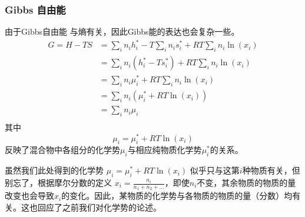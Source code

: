 \subsubsection{Gibbs 自由能}
由于Gibbs自由能 与熵有关，因此Gibbs能的表达也会复杂一些。
$$
\begin{aligned}
G = H-TS &= \sum_i n_i h_i^* - T \sum_i n_i s_i^* + RT \sum_i n_i \ln (x_i)\\ 
&= \sum_i n_i (h_i^* - T s_i^*) + RT \sum_i n_i \ln (x_i)\\
& = \sum_i n_i \mu_i^* + RT \sum_i n_i \ln (x_i)\\
&=\sum_i n_i (\mu_i^* + RT \ln (x_i))\\
&= \sum_i n_i \mu_i\\
\end{aligned}
$$
其中
$$
\mu_i = \mu_i^* + RT \ln (x_i)
$$
反映了混合物中各组分的化学势$\mu_i$与相应纯物质化学势$\mu_i^*$的关系。%

虽然我们此处得到的化学势 $\mu_i = \mu_i^* + RT \ln (x_i)$ 似乎只与这第$i$种物质有关，但别忘了，根据摩尔分数的定义 $x_i = \frac{n_i}{n_1+n_2+...}$，即使$n_i$不变，其余物质的物质的量改变也会导致$x_i$的变化。因此，某物质的化学势与各物质的物质的量（分数）均有关。这也回应了之前我们对化学势的论述。

